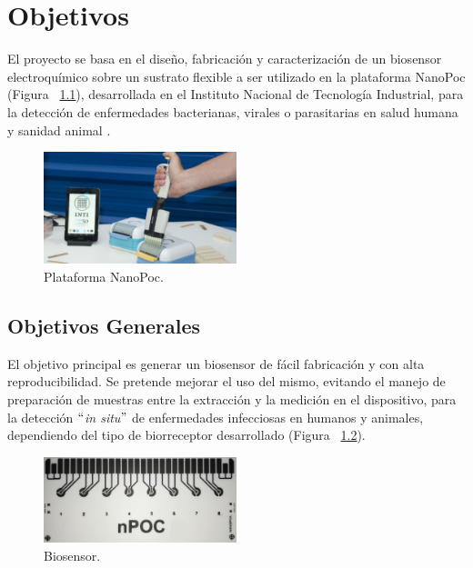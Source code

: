 \chapter{Objetivos}
El proyecto se basa en el diseño, fabricación y caracterización de un biosensor electroquímico sobre un sustrato flexible a ser utilizado en la plataforma NanoPoc (Figura ~\ref{fig:Figura_Nano_Poc}), desarrollada en el Instituto Nacional de Tecnología Industrial, para la detección de enfermedades bacterianas, virales o parasitarias en salud humana y sanidad animal \cite{PosterPoc2}.

\begin{figure}[H]
  \centering
    \includegraphics[width=0.5\textwidth]{Figuras/Figura_Nano_Poc}
  \caption{Plataforma NanoPoc.}
  \label{fig:Figura_Nano_Poc}
\end{figure}

\section{Objetivos Generales}
El objetivo principal es generar un biosensor de fácil fabricación y con alta reproducibilidad. Se pretende mejorar el uso del mismo, evitando el manejo de preparación de muestras entre la extracción y la medición en el dispositivo, para la detección $``$\textit{in situ}$"$ de enfermedades infecciosas en humanos y animales, dependiendo del tipo de biorreceptor desarrollado (Figura ~\ref{fig:Figura_Biosensor_objetivos}).
\begin{figure}[H]
  \centering
    \includegraphics[width=0.5\textwidth]{Figuras/Figura_Biosensor_objetivos}
  \caption{Biosensor.}
  \label{fig:Figura_Biosensor_objetivos}
\end{figure}
